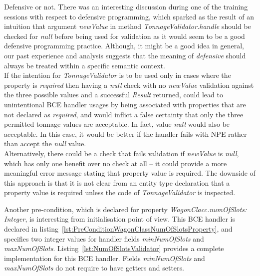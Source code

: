  \begin{notebox}{Defensive or not.}{\label{nb:DefensiveOrNot}}
    There was an interesting discussion during one of the training sessions with respect to defensive programming, which sparked as the result of an intuition that argument \emph{newValue} in method \emph{TonnageValidator.handle} should be checked for \emph{null} before being used for validation as it would seem to be a good defensive programming practice.    
    Although, it might be a good idea in general, our past experience and analysis suggests that the meaning of \emph{defensive} should always be treated within a specific semantic context.\\
    
    If the intention for \emph{TonnageValidator} is to be used only in cases where the property is \emph{required} then having a \emph{null} check with no \emph{newValue} validation against the three possible values and a successful \emph{Result} returned, could lead to unintentional BCE handler usages by being associated with properties that are not declared as \emph{required}, and would inflict a false certainty that only the three permitted tonnage values are acceptable.
    In fact, value \emph{null} would also be acceptable.
    In this case, it would be better if the handler fails with NPE rather than accept the \emph{null} value.\\
    
    Alternatively, there could be a check that fails validation if \emph{newValue} is \emph{null}, which has only one benefit over no check at all -- it could provide a more meaningful error message stating that property value is required.
    The downside of this approach is that it is not clear from an entity type declaration that a property value is required unless the code of \emph{TonnageValidator} is inspected.
  \end{notebox}


  Another pre-condition, which is declared for property \emph{WagonClacc.numOfSlots: Integer}, is interesting from initialisation point of view.
  This BCE handler is declared in listing~\ref{lst:PreConditionWagonClassNumOfSlotsProperty}, and specifies two integer values for handler fields \emph{minNumOfSlots} and \emph{maxNumOfSlots}.
  Listing~\ref{lst:NumOfSlotsValidator} provides a complete implementation for this BCE handler.
  Fields \emph{minNumOfSlots} and \emph{maxNumOfSlots} do not require to have getters and setters.

